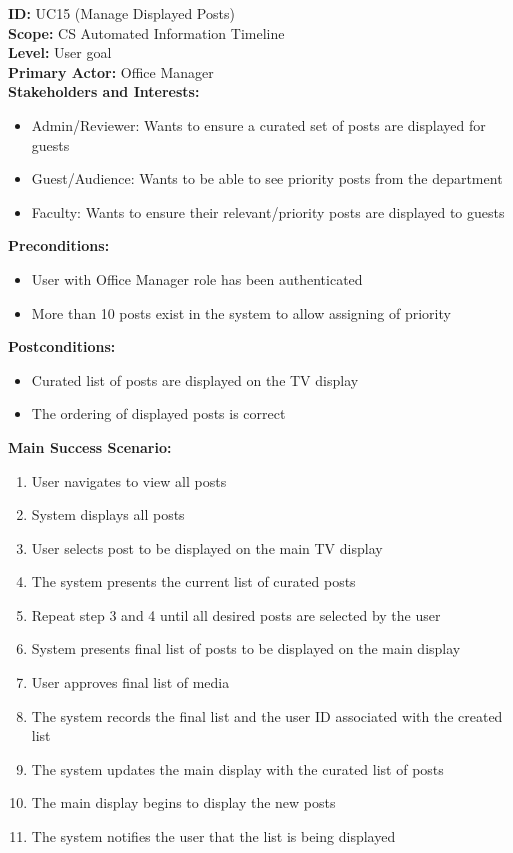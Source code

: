 \textbf{ID:} UC15 (Manage Displayed Posts) \\
\textbf{Scope:} CS Automated Information Timeline \\
\textbf{Level:} User goal \\
\textbf{Primary Actor:} Office Manager \\
\textbf{Stakeholders and Interests:}
\begin{itemize}
    \item Admin/Reviewer: Wants to ensure a curated set of posts are displayed for guests
    \item Guest/Audience: Wants to be able to see priority posts from the department
    \item Faculty: Wants to ensure their relevant/priority posts are displayed to guests
\end{itemize}
\textbf{Preconditions:}
\begin{itemize}
    \item User with Office Manager role has been authenticated
    \item More than 10 posts exist in the system to allow assigning of priority
\end{itemize}
\textbf{Postconditions:}
\begin{itemize}
    \item Curated list of posts are displayed on the TV display
    \item The ordering of displayed posts is correct
\end{itemize}
\textbf{Main Success Scenario:}
\begin{enumerate}
    \item User navigates to view all posts
    \item System displays all posts
    \item User selects post to be displayed on the main TV display
    \item The system presents the current list of curated posts
    \item Repeat step 3 and 4 until all desired posts are selected by the user
    \item System presents final list of posts to be displayed on the main display
    \item User approves final list of media
    \item The system records the final list and the user ID associated with the created list
    \item The system updates the main display with the curated list of posts
    \item The main display begins to display the new posts
    \item The system notifies the user that the list is being displayed
\end{enumerate}
